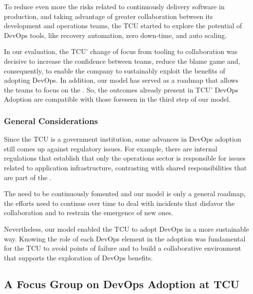 To reduce even more the risks related to continuously delivery software in
production, and taking advantage of greater collaboration between its development
and operations teams, the TCU started to explore the potential of DevOps tools,
like recovery automation, zero down-time, and auto scaling.

In our evaluation, the TCU' change of focus from tooling to collaboration was
decisive to increase the confidence between teams, reduce the blame game and,
consequently, to enable the company to sustainably exploit the benefits of
adopting DevOps. In addition, our model has served as a roadmap that allows
the teams to focus on the \cc. So, the outcomes already present in TCU' DevOps
Adoption are compatible with those foreseen in the third step of our model.

\subsubsection{General Considerations}
Since the TCU is a government institution, some advances in DevOps adoption
still comes up against regulatory issues. For example, there are internal
regulations that establish that only the operations sector is responsible for
issues related to application infrastructure, contrasting with shared
responsibilities that are part of the \cc.

{
\color{blue}
The \cc need to be continuously fomented and our model is only a general roadmap,
the efforts need to continue over time to deal with incidents that disfavor
the collaboration and to restrain the emergence of new ones.
}

Nevertheless, our model enabled the TCU to adopt DevOps in a more sustainable
way. Knowing the role of each DevOps element in the adoption was fundamental for
the TCU to avoid points of failure and to build a collaborative environment that
supports the exploration of DevOps benefits.

\subsection{A Focus Group on DevOps Adoption at TCU}

